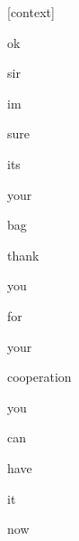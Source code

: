 \documentclass[varwidth]{standalone}
\begin{document}
\begin{CJK*}{UTF8}{gbsn}
{\setlength{\fboxsep}{0pt}\colorbox{white!0}{\parbox{0.9\textwidth}{
\colorbox{red!8.97205504590643e-18}{\strut [context]} \colorbox{red!1.5876040482254439e-09}{\strut ok} \colorbox{red!8.56307224239572e-07}{\strut sir} \colorbox{red!2.0393006252561463e-06}{\strut im} \colorbox{red!5.9318545027053915e-06}{\strut sure} \colorbox{red!0.010780049487948418}{\strut its} \colorbox{red!0.05466442555189133}{\strut your} \colorbox{red!0.0007193641504272819}{\strut bag} \colorbox{red!54.47404479980469}{\strut thank} \colorbox{red!12.65414047241211}{\strut you} \colorbox{red!7.434206485748291}{\strut for} \colorbox{red!25.224586486816406}{\strut your} \colorbox{red!0.002319223480299115}{\strut cooperation} \colorbox{red!0.009873384609818459}{\strut you} \colorbox{red!0.042095333337783813}{\strut can} \colorbox{red!0.00047610775800421834}{\strut have} \colorbox{red!0.0121360644698143}{\strut it} \colorbox{red!0.07995791733264923}{\strut now} 
}}}
\end{CJK*}
\end{document}

